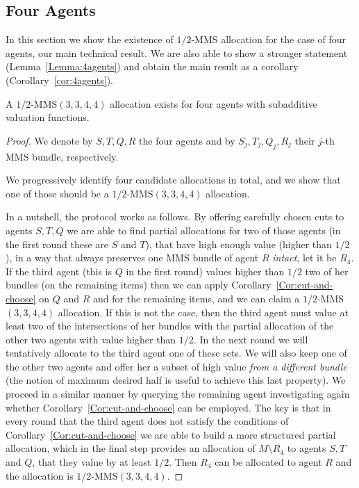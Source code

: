 \subsection{Four Agents}
In this section we show the existence of $1/2$-MMS allocation for the case of four agents, our main technical result. We are also able to show a stronger statement (Lemma~\ref{Lemma:4agents}) and obtain the main result as a corollary (Corollary~\ref{cor:4agents}). 

\label{sec:4Subadd}

\begin{lemma} 
\label{Lemma:4agents}
    A $1/2$-MMS$(3,3,4,4)$ allocation exists for four agents with subadditive valuation functions.
\end{lemma}
\begin{proof}
    We denote by $S,T,Q,R$ the four agents and by $S_j,T_j,Q_j,R_j$ their $j$-th MMS bundle, respectively. 
    
    We progressively identify four candidate allocations in total, and we show that one of those should be a $1/2$-MMS$(3,3,4,4)$ allocation. 

    In a nutshell, the protocol works as follows. By offering carefully chosen cuts to agents $S,T,Q$ we are able to find partial allocations for two of those agents (in the first round these are $S$ and $T$), that have high enough value (higher than $1/2$), in a way that always preserves one MMS bundle of agent $R$ {\em intact}, let it be $R_4$. If the third agent (this is $Q$ in the first round) values higher than $1/2$ two of her bundles (on the remaining items) then we can apply Corollary~\ref{Cor:cut-and-choose} on $Q$ and $R$ and for the remaining items, and we can claim a $1/2$-MMS$(3,3,4,4)$ allocation. If this is not the case, then the third agent must value at least two of the intersections of her bundles with the partial allocation of the other two agents with value higher than $1/2$. In the next round we will tentatively allocate to the third agent one of these sets. We will also keep one of the other two agents and offer her a subset of high value {\em from a different bundle} (the notion of maximum desired half is useful to achieve this last property). We proceed in a similar manner by querying the remaining agent investigating again whether Corollary~\ref{Cor:cut-and-choose} can be employed. The key is that in every round that the third agent does not satisfy the conditions of Corollary~\ref{Cor:cut-and-choose} we are able to build a more structured partial allocation, which in the final step provides an allocation of $M\setminus R_4$ to agents $S,T$ and $Q$, that they value by at least $1/2$. Then $R_4$ can be allocated to agent $R$ and the allocation is $1/2$-MMS$(3,3,4,4)$.
    

\end{proof}
